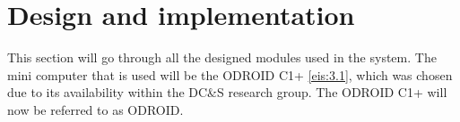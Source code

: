 \section{Design and implementation}\label{sec:design}
This section will go through all the designed modules used in the system. The mini computer that is used will be the ODROID C1+ \ref{eis:3.1}, which was chosen due to its availability within the DC\&S research group. The ODROID C1+ will now be referred to as ODROID.